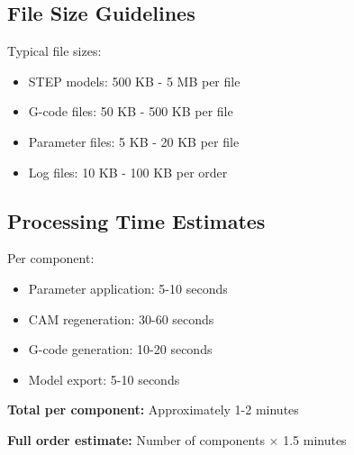 \documentclass[11pt,letterpaper]{article}
\begin{document}
\subsection{File Size Guidelines}

Typical file sizes:

\begin{itemize}
    \item STEP models: 500 KB - 5 MB per file
    \item G-code files: 50 KB - 500 KB per file
    \item Parameter files: 5 KB - 20 KB per file
    \item Log files: 10 KB - 100 KB per order
\end{itemize}

\subsection{Processing Time Estimates}

Per component:

\begin{itemize}
    \item Parameter application: 5-10 seconds
    \item CAM regeneration: 30-60 seconds
    \item G-code generation: 10-20 seconds
    \item Model export: 5-10 seconds
\end{itemize}

\textbf{Total per component:} Approximately 1-2 minutes

\textbf{Full order estimate:} Number of components × 1.5 minutes

\end{document}
